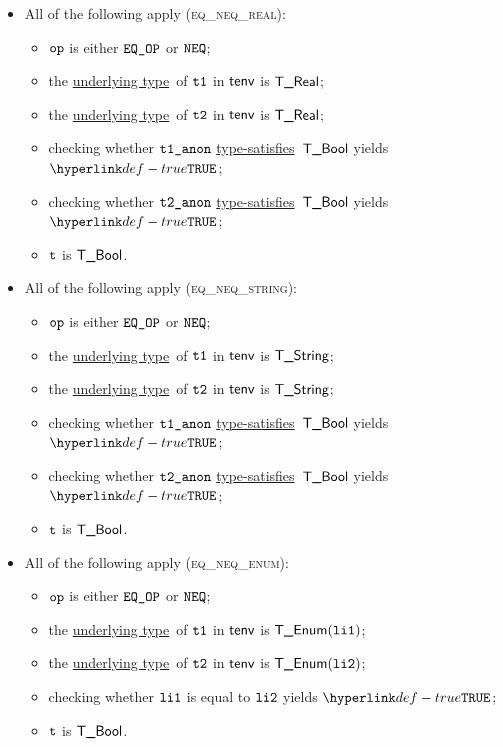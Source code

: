 \documentclass{book}
\newcommand\ProseOrTypeError[0]{\ProseTerminateAs{\TypeErrorConfig}}
\newcommand\underlyingtype[0]{\hyperlink{def-underlyingtype}{underlying type}}
\newcommand\typesatisfies[0]{\hyperlink{def-typesatisfies}{type-satisfies}}
\begin{document}
\begin{itemize}
  \item All of the following apply (\textsc{eq\_neq\_real}):
  \begin{itemize}
    \item $\texttt{op}$ is either $\texttt{EQ\_OP}$ or $\texttt{NEQ}$;
    \item the \underlyingtype\ of $\texttt{t1}$ in $\textsf{tenv}$ is $\textsf{T\_Real}$\ProseOrTypeError;
    \item the \underlyingtype\ of $\texttt{t2}$ in $\textsf{tenv}$ is $\textsf{T\_Real}$\ProseOrTypeError;
    \item checking whether $\texttt{t1\_anon}$ \typesatisfies\ $\textsf{T\_Bool}$ yields $\True$\ProseOrTypeError;
    \item checking whether $\texttt{t2\_anon}$ \typesatisfies\ $\textsf{T\_Bool}$ yields $\True$\ProseOrTypeError;
    \item $\texttt{t}$ is $\textsf{T\_Bool}$.
  \end{itemize}

  \item All of the following apply (\textsc{eq\_neq\_string}):
  \begin{itemize}
    \item $\texttt{op}$ is either $\texttt{EQ\_OP}$ or $\texttt{NEQ}$;
    \item the \underlyingtype\ of $\texttt{t1}$ in $\textsf{tenv}$ is $\textsf{T\_String}$\ProseOrTypeError;
    \item the \underlyingtype\ of $\texttt{t2}$ in $\textsf{tenv}$ is $\textsf{T\_String}$\ProseOrTypeError;
    \item checking whether $\texttt{t1\_anon}$ \typesatisfies\ $\textsf{T\_Bool}$ yields $\True$\ProseOrTypeError;
    \item checking whether $\texttt{t2\_anon}$ \typesatisfies\ $\textsf{T\_Bool}$ yields $\True$\ProseOrTypeError;
    \item $\texttt{t}$ is $\textsf{T\_Bool}$.
  \end{itemize}

  \item All of the following apply (\textsc{eq\_neq\_enum}):
  \begin{itemize}
    \item $\texttt{op}$ is either $\texttt{EQ\_OP}$ or $\texttt{NEQ}$;
    \item the \underlyingtype\ of $\texttt{t1}$ in $\textsf{tenv}$ is $\textsf{T\_Enum}(\texttt{li1})$\ProseOrTypeError;
    \item the \underlyingtype\ of $\texttt{t2}$ in $\textsf{tenv}$ is $\textsf{T\_Enum}(\texttt{li2})$\ProseOrTypeError;
    \item checking whether $\texttt{li1}$ is equal to $\texttt{li2}$ yields $\True$\ProseOrTypeError;
    \item $\texttt{t}$ is $\textsf{T\_Bool}$.
  \end{itemize}


\end{itemize}
\end{document}
